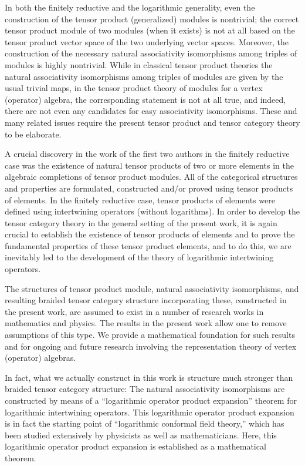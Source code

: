 \documentclass[12pt]{article}
\begin{document}
In both the finitely reductive and the logarithmic generality, even
the construction of the tensor product (generalized) modules is
nontrivial; the correct tensor product module of two modules (when it
exists) is not at all based on the tensor product vector space of the
two underlying vector spaces.  Moreover, the construction of the
necessary natural associativity isomorphisms among triples of modules
is highly nontrivial.  While in classical tensor product theories the
natural associativity isomorphisms among triples of modules are given
by the usual trivial maps, in the tensor product theory of modules for
a vertex (operator) algebra, the corresponding statement is not at all
true, and indeed, there are not even any candidates for easy
associativity isomorphisms.  These and many related issues require the
present tensor product and tensor category theory to be elaborate.

A crucial discovery in the work of the first two authors in the
finitely reductive case was the existence of natural tensor products
of two or more elements in the algebraic completions of tensor product
modules.  All of the categorical structures and properties are
formulated, constructed and/or proved using tensor products of
elements.  In the finitely reductive case, tensor products of elements
were defined using intertwining operators (without logarithms).  In
order to develop the tensor category theory in the general setting of
the present work, it is again crucial to establish the existence of
tensor products of elements and to prove the fundamental properties of
these tensor product elements, and to do this, we are inevitably led
to the development of the theory of logarithmic intertwining
operators.

The structures of tensor product module, natural associativity
isomorphisms, and resulting braided tensor category structure
incorporating these, constructed in the present work, are assumed to
exist in a number of research works in mathematics and physics.  The
results in the present work allow one to remove assumptions of this
type.  We provide a mathematical foundation for such results and for
ongoing and future research involving the representation theory of
vertex (operator) algebras.

In fact, what we actually construct in this work is structure much
stronger than braided tensor category structure: The natural
associativity isomorphisms are constructed by means of a ``logarithmic
operator product expansion'' theorem for logarithmic intertwining
operators.  This logarithmic operator product expansion is in fact the
starting point of ``logarithmic conformal field theory,'' which has
been studied extensively by physicists as well as mathematicians.
Here, this logarithmic operator product expansion is established as a
mathematical theorem.
\end{document}
